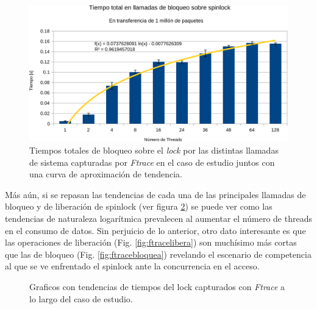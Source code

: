 \begin{figure}[!h]
	\centering
	\includegraphics[scale=.5]{resultados/sumaFtrace-crop.pdf}
	\caption{Tiempos totales de bloqueo sobre el \emph{lock} por las distintas llamadas de sistema capturadas por \emph{Ftrace} en el caso de estudio juntos con una curva de aproximación de tendencia.}
	\label{fig:sumaFtrace}
\end{figure}
Más aún, si se repasan las tendencias de cada una de las principales llamadas de bloqueo y de liberación de spinlock (ver figura \ref{fig:Ftracebloquealibera}) se puede ver como las tendencias de naturaleza logarítmica prevalecen al aumentar el número de threads en el consumo de datos. Sin perjuicio de lo anterior, otro dato interesante es que las operaciones de liberación (Fig. \ref{fig:ftracelibera}) son muchísimo más cortas que las de bloqueo (Fig. \ref{fig:ftracebloquea}) revelando el escenario de competencia al que se ve enfrentado el spinlock ante la concurrencia en el acceso.

\begin{figure}[h!]
	\centering
	\hspace*{\fill}
	\hfill
	\caption{Graficos con tendencias de tiempos del lock capturados con \emph{Ftrace} a lo largo del caso de estudio.}
	\label{fig:Ftracebloquealibera}
	\hspace*{\fill}
\end{figure}

